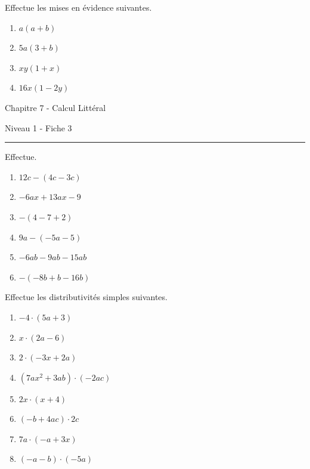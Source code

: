 \documentclass[12pt,parskip=half-, twoside=semi]{scrartcl}
\begin{document}
\begin{exercise} Effectue les mises en évidence suivantes.
  \begin{enumerate}[cols=2]
    \item $a(a+b)$
    \item $5a(3+b)$
    \item $xy(1+x)$
    \item $16x(1-2y)$
  \end{enumerate}
\end{exercise}

\begin{center}
  \bfseries
  \begin{Huge}
    Chapitre 7 - Calcul Littéral
  \end{Huge}
  \smallbreak
  \begin{large}
    Niveau 1  - Fiche 3
  \end{large}
  \smallbreak
  \rule[10pt]{.5\linewidth}{1 pt}
\end{center}

\setcounter{exercise}{0}
\begin{exercise}Effectue.
  \begin{enumerate}[cols=3]
      \item \(12 c-(4 c-3 c)\)
      \item \(-6 a x+13 a x-9\)
      \item \(-(4-7+2)\)
      \item \(9 a-(-5 a-5)\)
      \item \(-6 a b-9 a b-15 a b\)
      \item \(-(-8 b+b-16 b)\)
  \end{enumerate}
\end{exercise}

\begin{exercise}Effectue les distributivités simples suivantes.
  \begin{enumerate}[cols=2]
    \item $-4 \cdot(5 a+3)$
    \item $x \cdot(2 a-6)$
    \item $2 \cdot(-3 x+2 a)$
    \item $\left(7 a x^2+3 a b\right) \cdot(-2 a c)$
    \item $2 x \cdot(x+4)$
    \item $(-b+4 a c) \cdot 2 c$
    \item $7 a \cdot(-a+3 x)$
    \item $(-a-b) \cdot(-5 a)$
  \end{enumerate}
\end{exercise}
\end{document}
